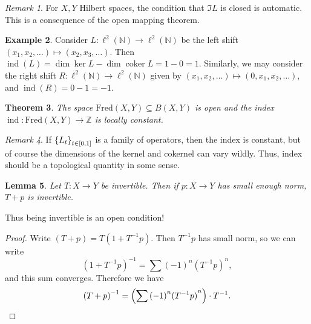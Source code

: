 \documentclass[leqno, openany]{memoir}
\newtheorem{thm}{Theorem}[section]
\newtheorem{lem}[thm]{Lemma}
\theoremstyle{definition}
\newtheorem{exm}[thm]{Example}
\theoremstyle{remark}
\newtheorem{rmk}[thm]{Remark}
\theoremstyle{plain}
\theoremstyle{definition}
\theoremstyle{remark}
\newcommand{\N}{\mathbb{N}}
\newcommand{\Z}{\mathbb{Z}}
\newcommand{\mr}[1]{\mathrm{#1}}
\DeclareMathOperator{\coker}{coker}
\DeclareMathOperator{\ind}{ind}
\begin{document}
\begin{rmk}
    For $X,Y$ Hilbert spaces, the condition that $\Im L$ is closed is automatic. This is a consequence of the open mapping theorem. 
\end{rmk}

\begin{exm}
    Consider $L \colon \ell^2(\N) \to \ell^2(\N)$ be the left shift $(x_1, x_2, \ldots) \mapsto (x_2, x_3, \ldots)$. Then $\ind(L) = \dim \ker L - \dim \coker L = 1 - 0 = 1$. Similarly, we may consider the right shift $R \colon \ell^2(\N) \to \ell^2(\N)$ given by $(x_1, x_2,\ldots) \mapsto (0,x_1,x_2,\ldots)$, and $\ind(R) = 0-1=-1$.
\end{exm}

\begin{thm}
    The space $\mr{Fred}(X,Y) \subseteq B(X,Y)$ is open and the index $\ind \colon \mr{Fred}(X,Y) \to \Z$ is locally constant.
\end{thm}

\begin{rmk}
    If $\qty{L_t}_{t \in [0,1]}$ is a family of operators, then the index is constant, but of course the dimensions of the kernel and cokernel can vary wildly. Thus, index should be a topological quantity in some sense.
\end{rmk}

\begin{lem}
    Let $T \colon X \to Y$ be invertible. Then if $p \colon X \to Y$ has small enough norm, $T + p$ is invertible.
\end{lem}

Thus being invertible is an open condition!

\begin{proof}
    Write $(T + p) = T(1 + T^{-1}p)$. Then $T^{-1}p$ has small norm, so we can write
    \[ {(1+T^{-1}p)}^{-1} = \sum {(-1)}^n {(T^{-1} p)}^n, \]
    and this sum converges. Therefore we have
    \[ {(T+p)}^{-1} = \qty(\sum {(-1)}^n {(T^{-1}p)}^n) \cdot T^{-1}. \qedhere \]
\end{proof}
\end{document}
